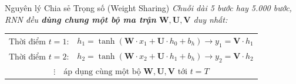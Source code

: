 \documentclass[aspectratio=169, 10pt]{beamer}
\begin{document}
\begin{frame}[fragile]{Nguyên lý Chia sẻ Trọng số (Weight Sharing)}
\footnotesize
\textit{Chuỗi dài 5 bước hay 5.000 bước, RNN đều \textbf{dùng chung một bộ ma trận} \(\mathbf{W}, \mathbf{U}, \mathbf{V}\) duy nhất:}

\vspace{0.03cm}
\begin{center}
{\scriptsize
\begin{tabular}{@{}ll@{}}
Thời điểm \(t=1\): & \(h_1 = \tanh( \mathbf{W} \cdot x_1 + \mathbf{U} \cdot h_0 + b_h ) \rightarrow y_1 = \mathbf{V} \cdot h_1\) \\
Thời điểm \(t=2\): & \(h_2 = \tanh( \mathbf{W} \cdot x_2 + \mathbf{U} \cdot h_1 + b_h ) \rightarrow y_2 = \mathbf{V} \cdot h_2\) \\
\multicolumn{2}{c}{\(\vdots \quad \text{áp dụng cùng một bộ } \mathbf{W}, \mathbf{U}, \mathbf{V} \text{ tới } t = T\)} \\
\end{tabular}}
\end{center}


\end{frame}
\end{document}
